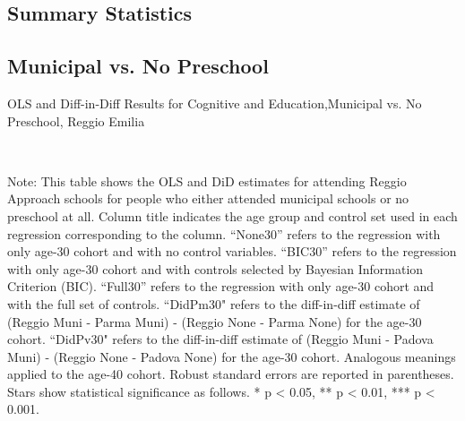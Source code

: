 \begin{landscape}
\subsection{Summary Statistics}

\end{landscape}

\begin{landscape}
\subsection{Municipal vs. No Preschool}
\begin{table}[H] \caption{OLS and Diff-in-Diff Results for Cognitive and Education,Municipal vs. No Preschool, Reggio Emilia} \label{ols-E-reg}
\scalebox{0.85}{}
\vspace{1ex} \\
\footnotesize\raggedright{Note: This table shows the OLS and DiD estimates for attending Reggio Approach schools for people who either attended municipal schools or no preschool at all. Column title indicates the age group and control set used in each regression corresponding to the column. ``None30'' refers to the regression with only age-30 cohort and with no control variables. ``BIC30'' refers to the regression with only age-30 cohort and with controls selected by Bayesian Information Criterion (BIC). ``Full30'' refers to the regression with only age-30 cohort and with the full set of controls. ``DidPm30" refers to the diff-in-diff estimate of (Reggio Muni - Parma Muni) - (Reggio None - Parma None) for the age-30 cohort. ``DidPv30" refers to the diff-in-diff estimate of (Reggio Muni - Padova Muni) - (Reggio None - Padova None) for the age-30 cohort. Analogous meanings applied to the age-40 cohort. Robust standard errors are reported in parentheses. Stars show statistical significance as follows. * p < 0.05, ** p < 0.01, *** p < 0.001.}
\end{table}



\end{landscape}
